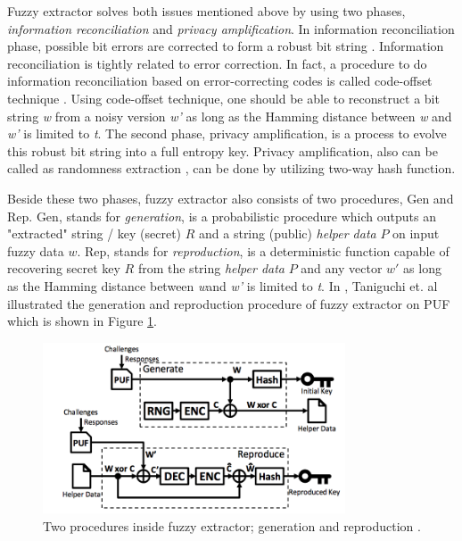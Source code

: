 Fuzzy extractor solves both issues mentioned above by using two phases, \textit{information reconciliation} and \textit{privacy amplification}. In information reconciliation phase, possible bit errors are corrected to form a robust bit string \cite{soft_decision}. Information reconciliation is tightly related to error correction. In fact, a procedure to do information reconciliation based on error-correcting codes is called code-offset technique \cite{fuzzy_extractor}. Using code-offset technique, one should be able to reconstruct a bit string \textit{w} from a noisy version \textit{w'} as long as the Hamming distance between \textit{w} and \textit{w'} is limited to \textit{t}.
The second phase, privacy amplification, is a process to evolve this robust bit string into a full entropy key. Privacy amplification, also can be called as randomness extraction \cite{information_reconciliation}, can be done by utilizing two-way hash function.

Beside these two phases, fuzzy extractor also consists of two procedures, \large{Gen} and \large{Rep}. \large{Gen}, stands for \textit{generation}, is a probabilistic procedure which outputs an "extracted" string / key (secret) $R$ and a string (public) \textit{helper data} $P$ on input fuzzy data $w$. \large{Rep}, stands for \textit{reproduction}, is a deterministic function capable of recovering secret key $R$ from the string \textit{helper data} $P$ and any vector $w'$ as long as the Hamming distance between \textit{w}and \textit{w'} is limited to \textit{t}.
In \cite{stable_key_generation}, Taniguchi et. al illustrated the generation and reproduction procedure of fuzzy extractor on PUF which is shown in Figure \ref{fig:scheme-key-generator}.

\begin{figure}[tph!]
    \centerline{\includegraphics[width={0.8\textwidth}]{images/scheme_stable_key_generation}}
    \caption{Two procedures inside fuzzy extractor; generation and reproduction \cite{stable_key_generation}.}
    \label{fig:scheme-key-generator}
\end{figure}

